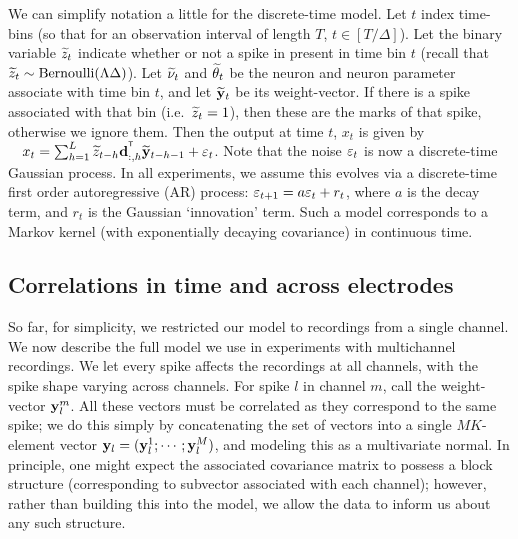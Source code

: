 We can simplify notation a little for the discrete-time model. Let $t$ index time-bins (so that for an observation interval of length 
$T$, $t \in [T/\Delta]$).
Let the binary variable $\widetilde{z}_t$ indicate whether or not a spike in present in time bin $t$ (recall that 
$\widetilde{z}_t \sim \text{Bernoulli}(\Lambda \Delta)$). Let
$\widetilde{\nu}_t$ and $\widetilde{\theta}_t$ be the neuron and neuron parameter associate with time bin $t$, and let $\widetilde{\mathbf{y}}_t$ be its weight-vector. 
If there is a spike associated with that bin (i.e.\ 
$\widetilde{z}_t = 1$), then these are the marks of that spike, otherwise we ignore them.
Then the output at time $t$, $x_t$ is given by
$\quad  x_t = \sum_{h = 1}^L \widetilde{z}_{t-h} \mathsf{\mathbf{d}}_{:,h}^{^{\mathsf{T}}} \widetilde{\mathbf{y}}_{t-h-1} + \varepsilon_t$. %
Note that the noise $\varepsilon_t$ is now a discrete-time Gaussian process. In all experiments, we assume this evolves via a discrete-time first order
autoregressive (AR) process: $\varepsilon_{t+1} = a \varepsilon_t + r_t$, where $a$ is the decay term, and $r_t$ is the Gaussian `innovation' term. Such a model
corresponds to a Markov kernel (with exponentially decaying covariance) in continuous time.
\subsection{Correlations in time and across electrodes}  \label{sec:multi}
So far, for simplicity, we restricted our model to recordings from a single channel. We now describe the full model we use in experiments with
multichannel recordings. We let every spike affects the recordings at all channels, with the spike shape varying across channels. 
For spike $l$ in channel $m$, call the weight-vector $\mathbf{y}^m_l$. All these vectors must be correlated as they correspond to the same spike; we do this 
simply by concatenating the set of vectors into
a single $MK$-element vector $\mathbf{y}_l = (\mathbf{y}^1_l;\cdots;\mathbf{y}^M_l)$, and modeling this as a multivariate normal. In principle, one might expect the associated 
covariance matrix to possess a block structure (corresponding to subvector associated with each channel); however, rather than building this into the model,
we allow the data to inform us about any such structure.

